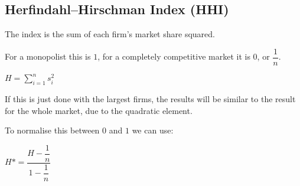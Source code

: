 
\subsection{Herfindahl–Hirschman Index (HHI)}

The index is the sum of each firm’s market share squared.

For a monopolist this is \(1\), for a completely competitive market it is \(0\), or \(\dfrac{1}{n}\).

\(H=\sum_{i=1}^ns^2_i\)

If this is just done with the largest firms, the results will be similar to the result for the whole market, due to the quadratic element.

To normalise this between \(0\) and \(1\) we can use:

\(H*=\dfrac{H-\dfrac{1}{n}}{1-\dfrac{1}{n}}\)

